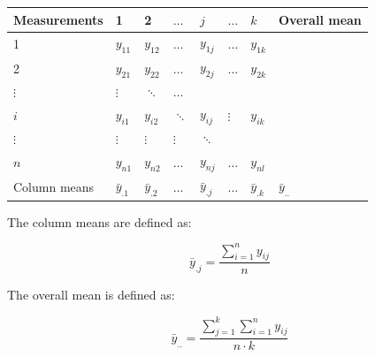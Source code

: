 \begin{center}
\begin{tabular}{llllllll}
\hline
Measurements & 1 & 2 & \(\hdots\) & \(j\) & \(\hdots\) & \(k\) & Overall mean\\[0pt]
\hline
1 & \(y_{11}\) & \(y_{12}\) & \(\hdots\) & \(y_{1j}\) & \(\hdots\) & \(y_{1k}\) & \\[0pt]
2 & \(y_{21}\) & \(y_{22}\) & \(\hdots\) & \(y_{2j}\) & \(\hdots\) & \(y_{2k}\) & \\[0pt]
\(\vdots\) & \(\vdots\) & \(\ddots\) & \(\hdots\) &  &  &  & \\[0pt]
\(i\) & \(y_{i1}\) & \(y_{i2}\) & \(\ddots\) & \(y_{ij}\) & \(\vdots\) & \(y_{ik}\) & \\[0pt]
\(\vdots\) & \(\vdots\) & \(\vdots\) & \(\vdots\) & \(\ddots\) &  &  & \\[0pt]
\(n\) & \(y_{n1}\) & \(y_{n2}\) & \(\hdots\) & \(y_{nj}\) & \(\hdots\) & \(y_{nl}\) & \\[0pt]
\hline
Column means & \(\bar{y}_{.1}\) & \(\bar{y}_{.2}\) & \(\hdots\) & \(\bar{y}_{.j}\) & \(\hdots\) & \(\bar{y}_{.k}\) & \(\bar{y}_{..}\)\\[0pt]
\hline
\end{tabular}
\end{center}

The column means are defined as:

\begin{equation}
  \bar{y}_{.j} = \frac{\sum^n_{i = 1}y_{ij}}{n}
\end{equation}

The overall mean is defined as:

\begin{equation}
  \bar{y}_{..} = \frac{\sum^k_{j = 1}\sum^n_{i = 1}y_{ij}}{n\cdot{}k}
\end{equation}